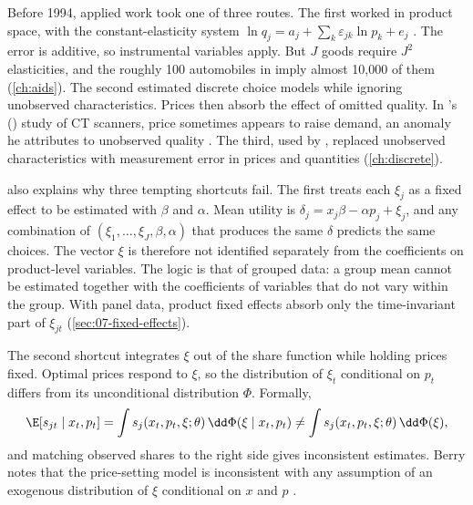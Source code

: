 Before 1994, applied work took one of three routes. The first worked in product space, with the
constant-elasticity system $\ln q_j = a_j + \sum_k \varepsilon_{jk}\ln p_k + e_j$ \citep[eq.~1]{Berry1994}.
The error is additive, so instrumental variables apply. But $J$ goods require $J^2$ elasticities, and the roughly
100 automobiles in \citet{Bresnahan1987} imply almost 10,000 of them \citep[p.~244]{Berry1994}
(\cref{ch:aids}). The second estimated discrete choice models while ignoring unobserved characteristics. Prices
then absorb the effect of omitted quality. In \citeauthor{Trajtenberg1989}'s (\citeyear{Trajtenberg1989})
study of CT scanners, price sometimes appears to raise demand, an anomaly he attributes to unobserved quality
\citep[p.~243]{Berry1994}. The third, used by \citet{Bresnahan1987}, replaced unobserved characteristics with
measurement error in prices and quantities (\cref{ch:discrete}).

\citet[Section~7]{Berry1994} also explains why three tempting shortcuts fail. The first treats each $\xi_j$ as
a fixed effect to be estimated with $\beta$ and $\alpha$. Mean utility is $\delta_j = x_j\beta - \alpha p_j +
\xi_j$, and any combination of $(\xi_1, \dots, \xi_J, \beta, \alpha)$ that produces the same $\delta$ predicts
the same choices. The vector $\xi$ is therefore not identified separately from the coefficients on
product-level variables. The logic is that of grouped data: a group mean cannot be estimated together with the
coefficients of variables that do not vary within the group. With panel data, product fixed effects absorb only
the time-invariant part of $\xi_{jt}$ (\cref{sec:07-fixed-effects}).

The second shortcut integrates $\xi$ out of the share function while holding prices fixed. Optimal prices
respond to $\xi$, so the distribution of $\xi_t$ conditional on $p_t$ differs from its unconditional
distribution $\Phi$. Formally,
\begin{equation*}
  \E[s_{jt} \mid x_t, p_t] = \int s_j(x_t, p_t, \xi; \theta)\,\dd\Phi(\xi \mid x_t, p_t)
  \ne \int s_j(x_t, p_t, \xi; \theta)\,\dd\Phi(\xi),
\end{equation*}
and matching observed shares to the right side gives inconsistent estimates. Berry notes that the
price-setting model is inconsistent with any assumption of an exogenous distribution of $\xi$ conditional on
$x$ and $p$ \citep[p.~256]{Berry1994}.

